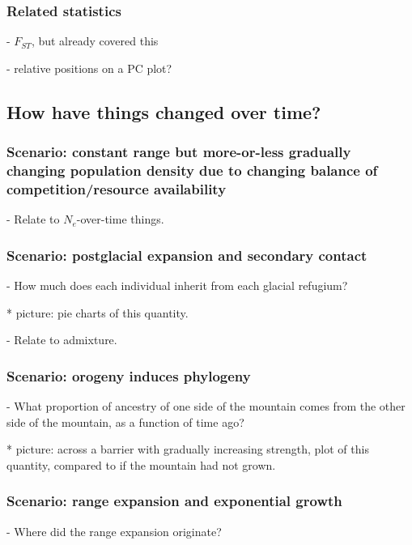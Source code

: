 \documentclass{ar-1col}
\begin{document}
\subsubsection{Related statistics}

        - $F_{ST}$, but already covered this

        - relative positions on a PC plot?

\subsection{How have things changed over time?}
\subsubsection{Scenario: constant range but more-or-less gradually changing population density due to changing balance of competition/resource availability}

        - Relate to $N_e$-over-time things.

\subsubsection{Scenario: postglacial expansion and secondary contact}

        - How much does each individual inherit from each glacial refugium?

            * picture: pie charts of this quantity.

        - Relate to admixture.

\subsubsection{Scenario: orogeny induces phylogeny}

        - What proportion of ancestry of one side of the mountain comes from the other side of the mountain,
            as a function of time ago?

            * picture: across a barrier with gradually increasing strength,
                plot of this quantity, compared to if the mountain had not grown.

\subsubsection{Scenario: range expansion and exponential growth}

        - Where did the range expansion originate?
\end{document}
